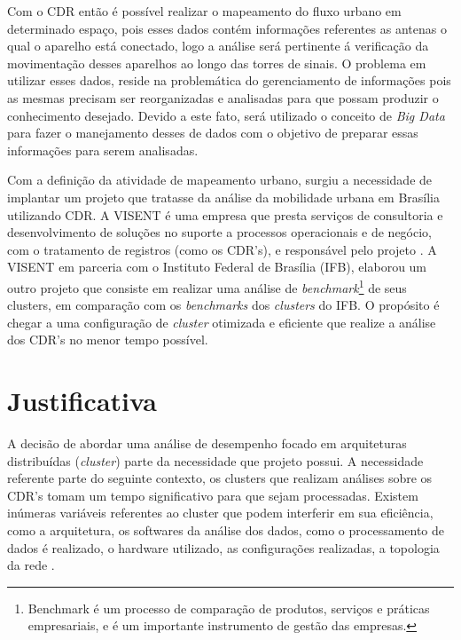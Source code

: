         Com o CDR então é possível realizar o mapeamento do fluxo urbano em determinado espaço,
        pois esses dados contém informações referentes as antenas o qual o aparelho está conectado,
        logo a análise será pertinente á verificação da movimentação desses aparelhos ao longo das
        torres de sinais. O problema em utilizar esses dados, reside na problemática do gerenciamento
        de informações pois as mesmas precisam ser reorganizadas e analisadas para que possam
        produzir o conhecimento desejado. Devido a este fato, será utilizado o conceito de
        \textit{Big Data} para fazer o manejamento desses de dados com o objetivo de preparar
        essas informações para serem analisadas.

        Com a definição da atividade de mapeamento urbano, surgiu a necessidade de implantar
        um projeto que tratasse da análise da mobilidade urbana em Brasília utilizando CDR. A
        VISENT é uma empresa que presta serviços de consultoria e desenvolvimento de
        soluções no suporte a processos operacionais e de negócio, com o tratamento de
        registros (como os CDR’s), e responsável pelo projeto \cite{visentsite}. A VISENT
        em parceria com o Instituto Federal de Brasília (IFB), elaborou um outro projeto que
        consiste em realizar uma análise de \textit{benchmark}\footnote{Benchmark é um
        processo de comparação de produtos, serviços e práticas empresariais, e é um
        importante instrumento de gestão das empresas.} de seus clusters, em comparação com
        os \textit{benchmarks} dos \textit{clusters} do IFB. O propósito é chegar a uma
        configuração de \textit{cluster} otimizada e eficiente que realize a análise dos CDR’s
        no menor tempo possível.

    \section{Justificativa}

        A decisão de abordar uma análise de desempenho focado em arquiteturas distribuídas
        (\textit{cluster}) parte da necessidade que projeto possui. A necessidade referente parte
        do seguinte contexto, os clusters que realizam análises sobre os CDR’s tomam um tempo
        significativo para que sejam processadas. Existem inúmeras variáveis referentes ao
        cluster que podem interferir em sua eficiência, como a arquitetura, os softwares
        da análise dos dados, como o processamento de dados é realizado, o hardware utilizado,
        as configurações realizadas, a topologia da rede
        \cite{madhavji2015}.

